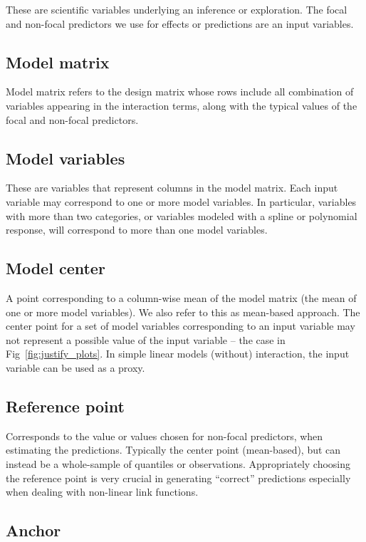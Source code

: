 These are scientific variables underlying an inference or exploration. The focal and non-focal predictors we use for effects or predictions are an input variables.

\subsection*{Model matrix}

Model matrix refers to the design matrix whose rows include all combination of variables appearing in the interaction terms, along with the typical values of the focal and non-focal predictors. 

\subsection*{Model variables}

These are variables that represent columns in the model matrix. Each input variable may correspond to one or more model variables. In particular, variables with more than two categories, or variables modeled with a spline or polynomial response, will correspond to more than one model variables.

\subsection*{Model center} 

A point corresponding to a column-wise mean of the model matrix (the mean of one or more model variables). We also refer to this as mean-based approach. The center point for a set of model variables corresponding to an input variable may not represent a possible value of the input variable -- the case in Fig~\ref{fig:justify_plots}. In simple linear models (without) interaction, the input variable can be used as a proxy.

\subsection*{Reference point}

Corresponds to the value or values chosen for non-focal predictors, when estimating the predictions. Typically the center point (mean-based), but can instead be a whole-sample of quantiles or observations. Appropriately choosing the reference point is very crucial in generating ``correct'' predictions especially when dealing with non-linear link functions.


\subsection*{Anchor}

